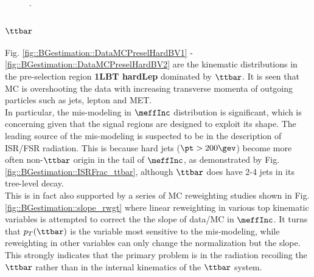\clearpage


%
\clearpage


\begin{figure}[h]
  \centering
    \caption{ .  \label{fig::BGestimation::VRZb} }
\end{figure}


\subsubsection{$\ttbar$}
Fig. \ref{fig::BGestimation::DataMCPreselHardBV1} - \ref{fig::BGestimation::DataMCPreselHardBV2} are the kinematic distributions in the pre-selection region \textbf{1LBT hardLep} dominated by $\ttbar$.
It is seen that MC is overshooting the data with increasing transverse momenta of outgoing particles such as jets, lepton and MET. \\


In particular, the mis-modeling in $\meffInc$ distribution is significant, which is concerning given that the signal regions are designed to exploit its shape. The leading source of the mis-modeling is suspected to be in the description of ISR/FSR radiation. This is because hard jets ($\pt>200 \gev$) become more often non-$\ttbar$ origin in the tail of $\meffInc$, as demonstrated by Fig. \ref{fig::BGestimation::ISRFrac_ttbar}, although $\ttbar$ does have 2-4 jets in its tree-level decay. \\
This is in fact also supported by a series of MC reweighting studies shown in Fig. \ref{fig::BGestimation::slope_rwgt}  where linear reweighting in various top kinematic variables is attempted to correct the the slope of data/MC in $\meffInc$. It turns that $p_{T}(\ttbar)$ is the variable most sensitive to the mis-modeling, while reweighting in other variables can only change the normalization but the slope. This strongly indicates that the primary problem is in the radiation recoiling the $\ttbar$ rather than in the internal kinematics of the $\ttbar$ system. \\


